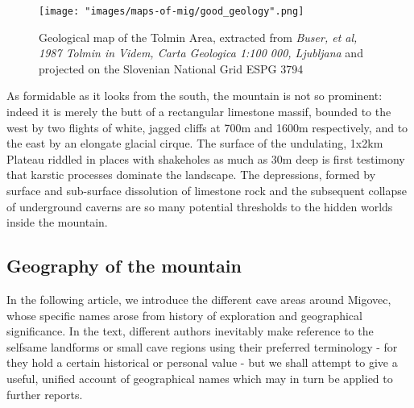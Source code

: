  \begin{figure*}[b!]
 \checkoddpage \ifoddpage \forcerectofloat \else \forceversofloat \fi
\centering
  \texttt{[image: "images/maps-of-mig/good\_geology".png]}
  \label{map m}
  \caption{Geological map of the Tolmin Area, extracted from \emph{Buser, et al, 1987 Tolmin in Videm, Carta Geologica 1:100 000, Ljubljana} and projected on the Slovenian National Grid ESPG 3794}
 \end{figure*}


As formidable as it looks from the south, the mountain is not so prominent: indeed it is merely the butt of a rectangular limestone massif, bounded to the west by two flights of white, jagged cliffs at 700m and 1600m respectively, and to the east by an elongate glacial cirque. The surface of the undulating, 1x2km Plateau riddled in places with shakeholes as much as 30m deep is first testimony that karstic processes dominate the landscape. The depressions, formed by surface and sub-surface dissolution of limestone rock and the subsequent collapse of underground caverns are so many potential thresholds to the hidden worlds inside the mountain.

\subsection{Geography of the mountain}
In the following article, we introduce the different cave areas around Migovec, whose specific names arose from history of exploration and geographical significance. In the text, different authors inevitably make reference to the selfsame landforms or small cave regions using their preferred terminology - for they hold a certain historical or personal value - but we shall attempt to give a useful, unified account of geographical names which may in turn be applied to further reports. 



